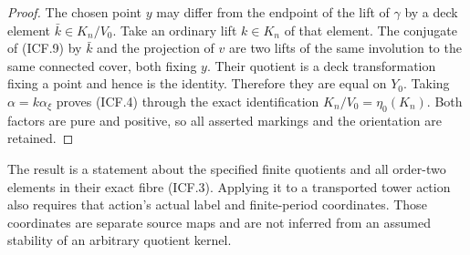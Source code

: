 \begin{proof}
The chosen point $y$ may differ from the endpoint of the lift
of $\gamma$ by a deck element $\bar k\in K_n/V_0$.
Take an ordinary lift $k\in K_n$ of that element.
The conjugate of (ICF.9) by $\bar k$ and the projection of $v$
are two lifts of the same involution to the same connected
cover, both fixing $y$.  Their quotient is a deck transformation
fixing a point and hence is the identity.  Therefore they are
equal on $Y_0$.  Taking $\alpha=k\alpha_\xi$ proves (ICF.4)
through the exact identification $K_n/V_0=\eta_0(K_n)$.
Both factors are pure and positive, so all asserted markings
and the orientation are retained.
\end{proof}

The result is a statement about the specified finite quotients
and all order-two elements in their exact fibre (ICF.3).
Applying it to a transported tower action also requires that
action's actual label and finite-period coordinates.  Those
coordinates are separate source maps and are not inferred from
an assumed stability of an arbitrary quotient kernel.
